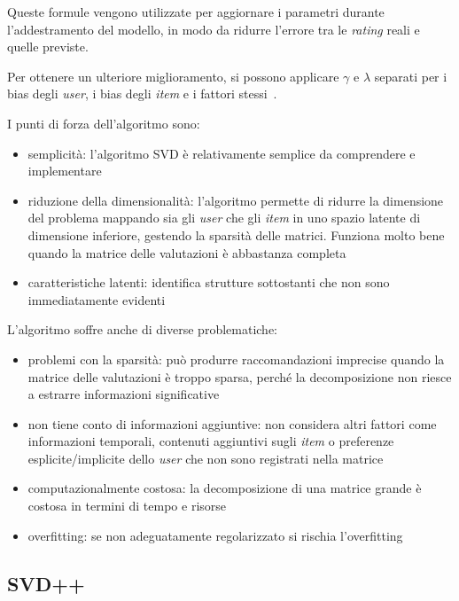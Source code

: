 Queste formule vengono utilizzate per aggiornare i parametri durante l'addestramento del modello, in modo da ridurre l'errore tra le
\textit{rating} reali e quelle previste.

Per ottenere un ulteriore miglioramento, si possono applicare $\gamma$ e $\lambda$ separati per i bias degli \textit{user}, i bias degli
\textit{item} e i fattori stessi~\cite{SVD_optimized}.

I punti di forza dell'algoritmo sono:

\begin{itemize}
    \item semplicità: l'algoritmo SVD è relativamente semplice da comprendere e implementare
    \item riduzione della dimensionalità: l'algoritmo permette di ridurre la dimensione del problema mappando sia gli \textit{user} che gli \textit{item} in uno spazio latente di dimensione inferiore, gestendo la sparsità delle matrici. Funziona molto bene quando la matrice delle valutazioni è abbastanza completa
    \item caratteristiche latenti: identifica strutture sottostanti che non sono immediatamente evidenti
\end{itemize}

L'algoritmo soffre anche di diverse problematiche:

\begin{itemize}
    \item problemi con la sparsità: può produrre raccomandazioni imprecise quando la matrice delle valutazioni è troppo sparsa, perché la decomposizione non riesce a estrarre informazioni significative
    \item non tiene conto di informazioni aggiuntive: non considera altri fattori come informazioni temporali, contenuti aggiuntivi sugli \textit{item} o preferenze esplicite/implicite dello \textit{user} che non sono registrati nella matrice
    \item computazionalmente costosa: la decomposizione di una matrice grande è costosa in termini di tempo e risorse
    \item overfitting: se non adeguatamente regolarizzato si rischia l'overfitting
\end{itemize}

\subsection{SVD++}\label{svdpp}

